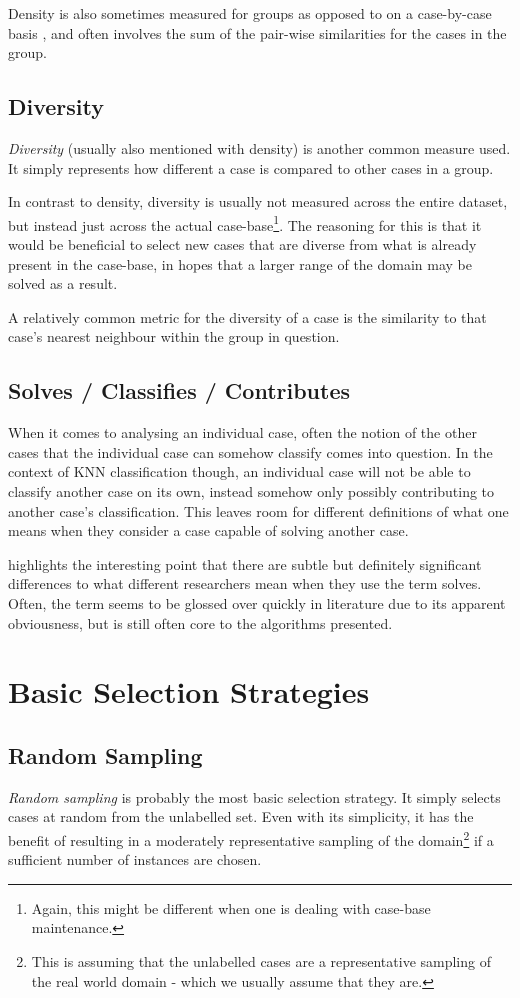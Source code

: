 \documentclass[a4paper,11pt]{report}
\begin{document}
Density is also sometimes measured for groups as opposed to on a case-by-case basis \citep{Smyth1998}, and often involves the sum of the pair-wise similarities for the cases in the group.

\subsection{Diversity}

\emph{Diversity} (usually also mentioned with density) is another common measure used. It simply represents how different a case is compared to other cases in a group.

In contrast to density, diversity is usually not measured across the entire dataset, but instead just across the actual case-base\footnote{Again, this might be different when one is dealing with case-base maintenance.}. The reasoning for this is that it would be beneficial to select new cases that are diverse from what is already present in the case-base, in hopes that a larger range of the domain may be solved as a result. 

A relatively common metric for the diversity of a case is the similarity to that case's nearest neighbour within the group in question.

\subsection{Solves / Classifies / Contributes}
When it comes to analysing an individual case, often the notion of the other cases that the individual case can somehow classify comes into question. In the context of KNN classification though, an individual case will not be able to classify another case on its own, instead somehow only possibly contributing to another case's classification. This leaves room for different definitions of what one means when they consider a case capable of solving another case. 

\citet{BridgeUpcoming} highlights the interesting point that there are subtle but definitely significant differences to what different researchers mean when they use the term solves. Often, the term seems to be glossed over quickly in literature due to its apparent obviousness, but is still often core to the algorithms presented.

\section{Basic Selection Strategies}
\subsection{Random Sampling}
\emph{Random sampling} is probably the most basic selection strategy. It simply selects cases at random from the unlabelled set. Even with its simplicity, it has the benefit of resulting in a moderately representative sampling of the domain\footnote{This is assuming that the unlabelled cases are a representative sampling of the real world domain - which we usually assume that they are.} if a sufficient number of instances are chosen.
\end{document}
